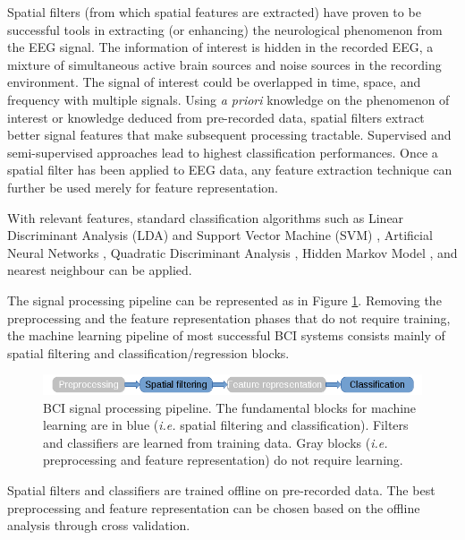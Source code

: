 Spatial filters (from which spatial features are extracted) have proven to be successful tools in extracting (or enhancing) the neurological phenomenon from the EEG signal. 
The information of interest is hidden in the recorded EEG, a mixture of simultaneous active brain sources and noise sources in the recording environment. 
The signal of interest could be overlapped in time, space, and frequency with multiple signals. 
Using \textit{a priori} knowledge on the phenomenon of interest 
 or knowledge deduced from pre-recorded data, spatial filters extract better signal features that make subsequent processing tractable. 
Supervised and semi-supervised approaches lead to highest classification performances.
Once a spatial filter has been applied to EEG data, any feature extraction technique can further be used merely for feature representation. 

With relevant features, standard classification algorithms such as Linear Discriminant Analysis (LDA) and Support Vector Machine (SVM) \citep{rivet_xdawn_2009, pfurtscheller_self-paced_2010, spuler_one_2012}, Artificial Neural Networks \citep{haselsteiner_using_2000, sturm_interpretable_2016}, Quadratic Discriminant Analysis \citep{friedman_regularized_1989, bhattacharyya_performance_2010}, Hidden Markov Model \citep{obermaier_hidden_2001, lee_pca+hmm+svm_2003, yan_classifying_2008}, and nearest neighbour \citep{cincotti_comparison_2003, schlogl_characterization_2005, bhattacharyya_performance_2010} can be applied.

The signal processing pipeline can be represented as in Figure \ref{fig:processing_pipeline}. 
Removing the preprocessing and the feature representation phases that do not require training, the machine learning pipeline of most successful BCI systems \citep{ang_filter_2012, spuler_one_2012, rivet_xdawn_2009} consists mainly of spatial filtering and classification/regression blocks.

\begin{figure}[!h]
\centering
\includegraphics[width=0.8\columnwidth]{Figures/processing_pipeline}
\caption{BCI signal processing pipeline. The fundamental blocks for machine learning are in blue (\textit{i.e.} spatial filtering and classification). Filters and classifiers are learned from training data. Gray blocks (\textit{i.e.} preprocessing and feature representation) do not require learning. }
\label{fig:processing_pipeline}
\end{figure}
Spatial filters and classifiers are trained offline on pre-recorded data. 
The best preprocessing and feature representation can be chosen based on the offline analysis through cross validation. 

